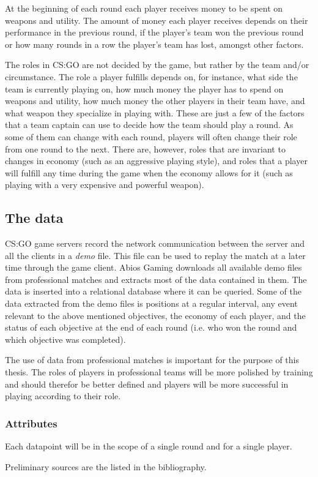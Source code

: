At the beginning of each round each player receives money to be spent on weapons and utility. The amount of money each player receives depends on their performance in the previous round, if the player's team won the previous round or how many rounds in a row the player's team has lost, amongst other factors.

The roles in CS:GO are not decided by the game, but rather by the team and/or circumstance. The role a player fulfills depends on, for instance, what side the team is currently playing on, how much money the player has to spend on weapons and utility, how much money the other players in their team have, and what weapon they specialize in playing with. These are just a few of the factors that a team captain can use to decide how the team should play a round. As some of them can change with each round, players will often change their role from one round to the next. There are, however, roles that are invariant to changes in economy (such as an aggressive playing style), and roles that a player will fulfill any time during the game when the economy allows for it (such as playing with a very expensive and powerful weapon).

\subsection{The data}
CS:GO game servers record the network communication between the server and all the clients in a {\it demo} file. This file can be used to replay the match at a later time through the game client. Abios Gaming downloads all available demo files from professional matches and extracts most of the data contained in them. The data is inserted into a relational database where it can be queried. Some of the data extracted from the demo files is positions at a regular interval, any event relevant to the above mentioned objectives, the economy of each player, and the status of each objective at the end of each round (i.e. who won the round and which objective was completed).

The use of data from professional matches is important for the purpose of this thesis. The roles of players in professional teams will be more polished by training and should therefor be better defined and players will be more successful in playing according to their role.

\subsubsection{Attributes}
Each datapoint will be in the scope of a single round and for a single player. 


Preliminary sources are the listed in the bibliography. \cite{coates2011analysis} \cite{figueiredo2002unsupervised} \cite{hastie2009unsupervised} \cite{10.1007/978-3-319-24589-8_9}